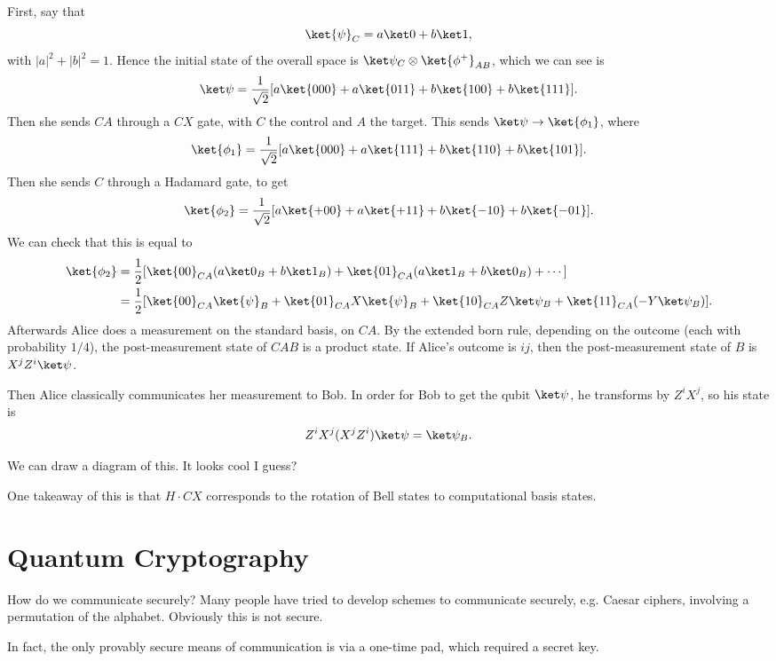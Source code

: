 \documentclass[12pt]{article}
\begin{document}
First, say that
\[
	\ket{\psi}_C = a \ket 0 + b \ket 1,
\]
with $|a|^2 + |b|^2 = 1$. Hence the initial state of the overall space is $\ket\psi_C \otimes \ket{\phi^+}_{AB}$, which we can see is
\[
	\ket \psi = \frac{1}{\sqrt 2}[a \ket{000} + a \ket{011} + b\ket{100} + b \ket{111}].
\]
Then she sends $CA$ through a $CX$ gate, with $C$ the control and $A$ the target. This sends $\ket \psi \to \ket{\phi_1}$, where
\[
	\ket{\phi_1} = \frac{1}{\sqrt 2} [a \ket{000} + a \ket{111} + b\ket{110} + b \ket{101}].
\]
Then she sends $C$ through a Hadamard gate, to get
\[
	\ket{\phi_2} = \frac{1}{\sqrt 2} [a \ket{+00} + a \ket{+11} + b \ket{-10} + b \ket{-01}].
\]
We can check that this is equal to
\begin{align*}
	\ket{\phi_2} &= \frac{1}{2} [\ket{00}_{CA}(a \ket 0_B + b \ket 1_B) + \ket{01}_{CA}(a \ket 1_B + b \ket 0_B) + \cdots ] \\
		     &= \frac{1}{2} [ \ket{00}_{CA} \ket{\psi}_B + \ket{01}_{CA} X \ket{\psi}_B + \ket{10}_{CA} Z \ket \psi_B + \ket{11}_{CA}(-Y \ket \psi_B)].
\end{align*}
Afterwards Alice does a measurement on the standard basis, on $CA$. By the extended born rule, depending on the outcome (each with probability $1/4$), the post-measurement state of $CAB$ is a product state. If Alice's outcome is $ij$, then the post-measurement state of $B$ is $X^j Z^i \ket \psi$.

Then Alice classically communicates her measurement to Bob. In order for Bob to get the qubit $\ket \psi$, he transforms by $Z^i X^j$, so his state is
\[
Z^i X^j(X^j Z^i) \ket \psi = \ket \psi_B.
\]

We can draw a diagram of this. It looks cool I guess?

One takeaway of this is that $H \cdot CX$ corresponds to the rotation of Bell states to computational basis states.


\newpage

\section{Quantum Cryptography}
\label{sec:q_crypto}

How do we communicate securely? Many people have tried to develop schemes to communicate securely, e.g. Caesar ciphers, involving a permutation of the alphabet. Obviously this is not secure.

In fact, the only provably secure means of communication is via a one-time pad, which required a secret key.
\end{document}
